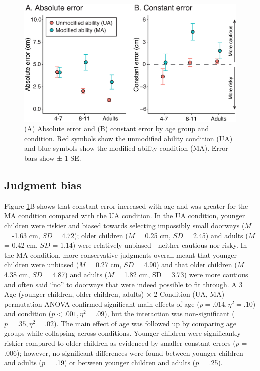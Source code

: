 \documentclass[a4paper,man,natbib,floatsintext,noextraspace]{apa6}
\begin{document}
\begin{figure}[htb!]
\centering
\includegraphics[width=.85\textwidth]{error.eps}
\caption{\label{fig:error}(A) Absolute error and (B) constant error by age group and condition. Red symbols show the unmodified ability condition (UA) and blue symbols show the modified ability condition (MA). Error bars show ± 1 SE.}
\end{figure}

\subsection{Judgment bias}

Figure \ref{fig:error}B shows that constant error increased with age and was greater for the MA condition compared with the UA condition. In the UA condition, younger children were riskier and biased towards selecting impossibly small doorways ($M$ = -1.63 cm, $SD = 4.72$); older children ($M$ = 0.25 cm, $SD$ = 2.45) and adults ($M$ = 0.42 cm, $SD$ = 1.14) were relatively unbiased---neither cautious nor risky. In the MA condition, more conservative judgments overall meant that younger children were unbiased ($M$ = 0.27 cm, $SD$ = 4.90) and that older children ($M$ = 4.38 cm, $SD$ = 4.87) and adults ($M$ = 1.82 cm, SD = 3.73) were more cautious and often said “no” to doorways that were indeed possible to fit through. A 3 Age (younger children, older children, adults) × 2 Condition (UA, MA) permutation ANOVA confirmed significant main effects of age ($p = .014, \eta^{2} = .10$) and condition ($p < .001, \eta^{2} = .09$), but the interaction was non-significant ($p = .35, \eta^{2} = .02$). The main effect of age was followed up by comparing age groups while collapsing across conditions. Younger children were significantly riskier compared to older children as evidenced by smaller constant errors ($p$ = .006); however, no significant differences were found between younger children and adults ($p$ = .19) or between younger children and adults ($p$ = .25).
\end{document}
